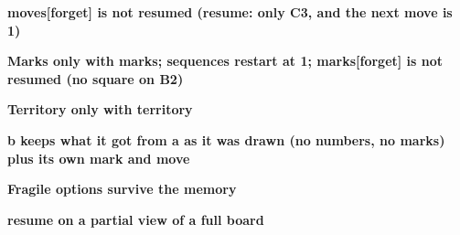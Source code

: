 \documentclass{article}
\newcommand\case[1]{\par\medskip\noindent\textbf{#1}\par\nopagebreak}
\begin{document}
\case{moves[forget] is not resumed (resume: only C3, and the next move is 1)}
\begin{goban}[5, name = a]\end{goban}
\begin{goban}[5, resume = a]\end{goban}

\case{Marks only with marks; sequences restart at 1; marks[forget] is not resumed (no square on B2)}
\begin{goban}[5, name = a]\end{goban}
\begin{goban}[5, resume = a]\end{goban}
\begin{goban}[5, resume = {a, marks}]\end{goban}

\case{Territory only with territory}
\begin{goban}[5, name = a]\end{goban}
\begin{goban}[5, resume = a]\end{goban}
\begin{goban}[5, resume = {a, territory}]\end{goban}

\case{b keeps what it got from a as it was drawn (no numbers, no marks) plus its own mark and move}
\begin{goban}[5, name = a]\end{goban}
\begin{goban}[5, name = b, resume = a]\end{goban}
\begin{goban}[5, resume = {b, numbers, marks}]\end{goban}

\case{Fragile options survive the memory}
\begin{goban}[5, name = a]\end{goban}
\begin{goban}[5, resume = {a, marks}]\end{goban}

\case{resume on a partial view of a full board}
\begin{goban}[9, name = a]\end{goban}
\begin{goban}[9, resume = a, partial = A1:E5]\end{goban}
\end{document}
